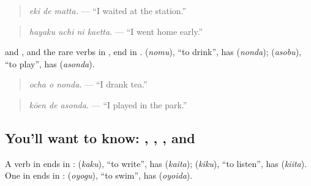 \begin{quote}
\emph{eki de matta.} — \textquotedblleft{}I waited at the station.\textquotedblright{}
\end{quote}

\begin{quote}
\textbf{  }
\end{quote}

\begin{quote}
\emph{hayaku uchi ni kaetta.} — \textquotedblleft{}I went home early.\textquotedblright{}
\end{quote}

\textbf{} and \textbf{}, and the rare verbs in \textbf{}, end in \textbf{}. \textbf{} (\emph{nomu}), \textquotedblleft{}to drink\textquotedblright{}, has \textbf{} (\emph{nonda}); \textbf{} (\emph{asobu}), \textquotedblleft{}to play\textquotedblright{}, has \textbf{} (\emph{asonda}).

\begin{quote}
\textbf{ }
\end{quote}

\begin{quote}
\emph{ocha o nonda.} — \textquotedblleft{}I drank tea.\textquotedblright{}
\end{quote}

\begin{quote}
\textbf{ }
\end{quote}

\begin{quote}
\emph{kōen de asonda.} — \textquotedblleft{}I played in the park.\textquotedblright{}
\end{quote}

\subsection*{You'll want to know: , , , and }
A verb in \textbf{} ends in \textbf{}: \textbf{} (\emph{kaku}), \textquotedblleft{}to write\textquotedblright{}, has \textbf{} (\emph{kaita}); \textbf{} (\emph{kiku}), \textquotedblleft{}to listen\textquotedblright{}, has \textbf{} (\emph{kiita}). One in \textbf{} ends in \textbf{}: \textbf{} (\emph{oyogu}), \textquotedblleft{}to swim\textquotedblright{}, has \textbf{} (\emph{oyoida}).

